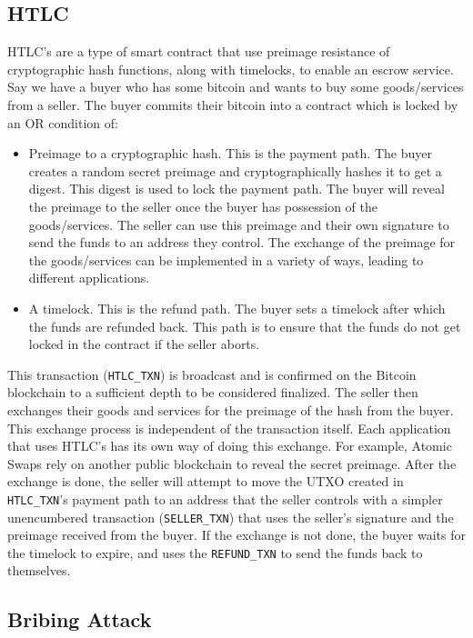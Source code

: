 \documentclass[runningheads]{llncs}
\newcommand{\htlctxn}{\texttt{HTLC\_TXN}}
\newcommand{\sellertxn}{\texttt{SELLER\_TXN}}
\newcommand{\refundtxn}{\texttt{REFUND\_TXN}}
\begin{document}
\subsection{HTLC}
HTLC's are a type of smart contract that use preimage resistance of cryptographic hash functions, along with timelocks, to enable an escrow service. Say we have a buyer who has some bitcoin and wants to buy some goods/services from a seller. The buyer commits their bitcoin into a contract which is locked by an OR condition of:
\begin{itemize}
    \item Preimage to a cryptographic hash. This is the payment path. The buyer creates a random secret preimage and cryptographically hashes it to get a digest. This digest is used to lock the payment path. The buyer will reveal the preimage to the seller once the buyer has possession of the goods/services. The seller can use this preimage and their own signature to send the funds to an address they control. The exchange of the preimage for the goods/services can be implemented in a variety of ways, leading to different applications.
    \item A timelock. This is the refund path. The buyer sets a timelock after which the funds are refunded back. This path is to ensure that the funds do not get locked in the contract if the seller aborts. 
\end{itemize}

This transaction (\htlctxn{}) is broadcast and is confirmed on the Bitcoin blockchain to a sufficient depth to be considered finalized. The seller then exchanges their goods and services for the preimage of the hash from the buyer. This exchange process is independent of the transaction itself. Each application that uses HTLC's has its own way of doing this exchange. For example, Atomic Swaps rely on another public blockchain to reveal the secret preimage. After the exchange is done, the seller will attempt to move the UTXO created in \htlctxn{}'s payment path to an address that the seller controls with a simpler unencumbered transaction (\sellertxn{}) that uses the seller's signature and the preimage received from the buyer. If the exchange is not done, the buyer waits for the timelock to expire, and uses the \refundtxn{} to send the funds back to themselves.

\subsection{Bribing Attack}
\end{document}
